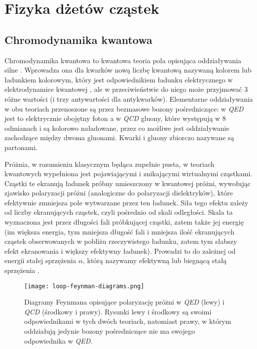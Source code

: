 \section{Fizyka dżetów cząstek}


\subsection{Chromodynamika kwantowa}

Chromodynamika kwantowa  to kwantowa teoria pola opisująca oddziaływania silne \cite{perkins_2005}. Wprowadza ona dla kwarków nową liczbę kwantową nazywaną kolorem lub ładunkiem kolorowym, który jest odpowiednikiem ładunku elektrycznego w elektrodynamice kwantowej , ale w przeciwieństwie do niego może przyjmować 3 różne wartości (i trzy antywartości dla antykwarków). Elementarne oddziaływania w obu teoriach przenoszone są przez bezmasowe bozony pośredniczące: w \textit{QED} jest to elektrycznie obojętny foton a w \textit{QCD} gluony, które występują w 8 odmianach i są kolorowo naładowane, przez co możliwe jest oddziaływanie zachodzące między dwoma gluonami. Kwarki i gluony zbiorczo nazywane są partonami.

Próżnia, w rozumieniu klasycznym będąca zupełnie pusta, w teoriach kwantowych wypełniona jest pojawiającymi i znikającymi wirtualnymi cząstkami. Cząstki te ekranują ładunek próbny umieszczony w kwantowej próżni, wywołując zjawisko polaryzacji próżni (analogiczne do polaryzacji dielektryków), które efektywnie zmniejsza pole wytwarzane przez ten ładunek. 
Siła tego efektu zależy od liczby ekranujących cząstek, czyli pośrednio od skali odległości. Skala ta wyznaczona jest przez długości fali próbkującej cząstki, zatem także jej energię (im większa energia, tym mniejsza długość fali i mniejsza ilość ekranujących cząstek obserwowanych w pobliżu rzeczywistego ładunku, zatem tym słabszy efekt ekranowania i większy efektywny ładunek). Prowadzi to do zależnej od energii stałej sprzężenia $\alpha$, którą nazywamy  efektywną lub biegnącą stałą sprzężenia . 


\begin{figure}[h]
	\centering
	\texttt{[image: loop-feynman-diagrams.png]}
	\caption{Diagramy Feynmana opisujące polaryzację próżni w \textit{QED} (lewy) i \textit{QCD} (środkowy i prawy). Rysunki lewy i środkowy są swoimi odpowiednikami w tych dwóch teoriach, natomiast prawy, w którym oddziałują jedynie bozony pośredniczące nie ma swojego odpowiednika w \textit{QED}. }
	\label{fig:feynman-diagrams}
\end{figure}

